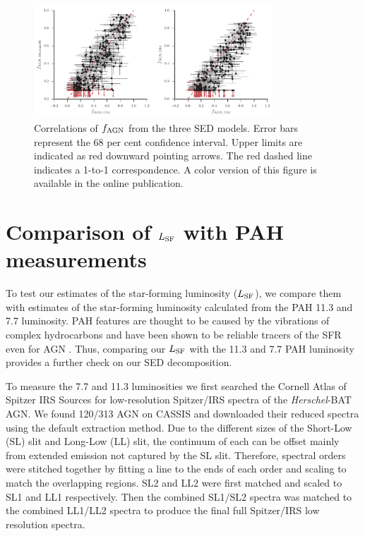 \documentclass[fleqn, usenatbib]{mnras}
\newcommand{\herschel}{\emph{Herschel}}
\begin{document}
\begin{figure}
\includegraphics[width=0.8\textwidth]{figures/agn_frac-comparison_nokde}
\caption{Correlations of $f_{\rm AGN}$ from the three SED models.  Error bars represent the 68 per cent confidence interval. Upper limits are indicated as red downward pointing arrows. The red dashed line indicates a 1-to-1 correspondence. A color version of this figure is available in the online publication. \label{fig:agn_frac_comp}}
\end{figure}

\section{Comparison of $L_{\rm SF}$ with PAH measurements}\label{sec:pah_comp}
To test our estimates of the star-forming luminosity ($L_{\rm SF}$), we compare them with estimates of the star-forming luminosity calculated from the PAH 11.3 and 7.7 \micron{} luminosity. PAH features are thought to be caused by the vibrations of complex hydrocarbons \citep{Draine:1984fk, Puget:1989lr} and have been shown to be reliable tracers of the SFR \citep{Roussel:2001kx, Sargsyan:2009fj, Treyer:2010uq, Shipley:2016qy} even for AGN \citep{Diamond-Stanic:2010kl}. Thus, comparing our $L_{\rm SF}$ with the 11.3 and 7.7 \micron{} PAH luminosity provides a further check on our SED decomposition. 

To measure the 7.7 and 11.3 \micron{} luminosities we first searched the Cornell Atlas of Spitzer IRS Sources \citep[CASSIS;]{Lebouteiller:2011dk} for low-resolution Spitzer/IRS spectra of the \herschel-BAT AGN. We found 120/313 AGN on CASSIS and downloaded their reduced spectra using the default extraction method. Due to the different sizes of the Short-Low (SL) slit and Long-Low (LL) slit, the continuum of each can be offset mainly from extended emission not captured by the SL slit. Therefore, spectral orders were stitched together by fitting a line to the ends of each order and scaling to match the overlapping regions. SL2 and LL2 were first matched and scaled to SL1 and LL1 respectively. Then the combined SL1/SL2 spectra was matched to the combined LL1/LL2 spectra to produce the final full Spitzer/IRS low resolution spectra. 
\end{document}
